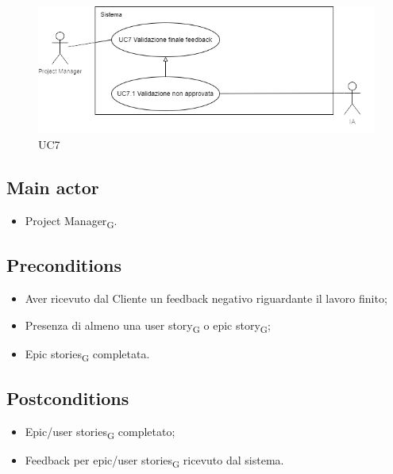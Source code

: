 \documentclass{article}
\begin{document}
\begin{figure}[h]
      \centering
      \includegraphics{./imgUML/UC7.png}
        \caption{UC7}
      \label{fig:UC7}
    \end{figure}
    
    \subsection*{Main actor}
    \begin{itemize}
        \item Project Manager\textsubscript{G}.
    \end{itemize}
    
    \subsection*{Preconditions}
    \begin{itemize}
        \item Aver ricevuto dal Cliente un feedback negativo riguardante il lavoro finito;
        \item Presenza di almeno una user story\textsubscript{G}  o epic story\textsubscript{G};
        \item Epic stories\textsubscript{G}  completata.
    \end{itemize}
    
    \subsection*{Postconditions}
    \begin{itemize}
        \item Epic/user stories\textsubscript{G}  completato;
        \item Feedback per epic/user stories\textsubscript{G}  ricevuto dal sistema.
    \end{itemize}
    
\end{document}

